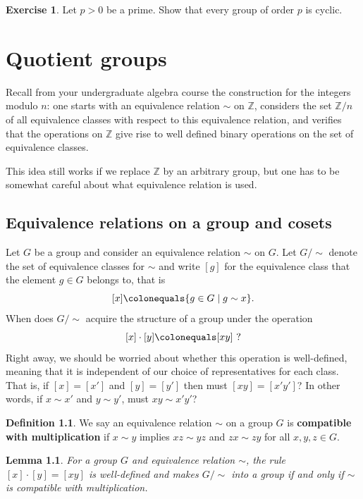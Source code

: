 \documentclass[12pt]{report}
\newtheorem{lemma}[theorem]{Lemma}
\numberwithin{equation}{section}
\numberwithin{theorem}{chapter}
\theoremstyle{definition}
\newtheorem{definition}[theorem]{Definition}
\newtheorem{exercise}{Exercise}
\newtheorem*{basic properties}{Basic Properties}
\newtheorem*{Important Remark}{Important Remark}
\newcommand{\Z}{\mathbb{Z}}
\begin{document}
\begin{exercise}\label{prime order implies cyclic}
Let $p>0$ be a prime. Show that every group of order $p$ is cyclic.
\end{exercise}





\chapter{Quotient groups}

Recall from your undergraduate algebra course the construction for the integers modulo $n$: one starts with an equivalence relation $\sim$ on $\Z$, considers the set $\Z/n$ of all equivalence classes with respect to this equivalence relation, and verifies that the operations on $\Z$ give rise to well defined binary operations on the set of equivalence classes. 

This idea still works if we replace $\Z$ by an arbitrary group, but one has to be somewhat careful about what equivalence relation is used. 

\section{Equivalence relations on a group and cosets}
 
Let $G$ be a group and consider an equivalence relation $\sim$ on $G$.
Let $G/\sim$ denote the set of equivalence classes for $\sim$ and write $[g]$ for the equivalence class that the element $g \in G$ belongs to, that is
$$[x] \colonequals \{g \in G \mid g \sim x\}.$$
When does $G/\sim$ acquire the structure of a group under the operation
$$[x] \cdot [y] \colonequals [xy] \ ?$$
Right away, we should be worried about whether this operation is well-defined, meaning that it is independent of our choice of representatives for each class. That is, if $[x] = [x']$ and $[y] = [y']$  then must $[xy] = [x'y']$? In other words, if $x \sim x'$ and $y \sim y'$, must $xy \sim x'y'$? 


\begin{definition}
We say an equivalence relation $\sim$ on a group $G$ is {\bf compatible with multiplication} if $x \sim y$ implies $xz \sim yz$ and $zx \sim zy$ for all $x,y,z \in G$.
 \end{definition}

\begin{lemma}\label{quotient group operation well-defined}
For a group $G$ and equivalence relation $\sim$, the rule $[x] \cdot [y] = [xy]$ is well-defined and makes $G/\sim$ into a group if and only if $\sim$ is compatible with multiplication.
\end{lemma}
\end{document}
